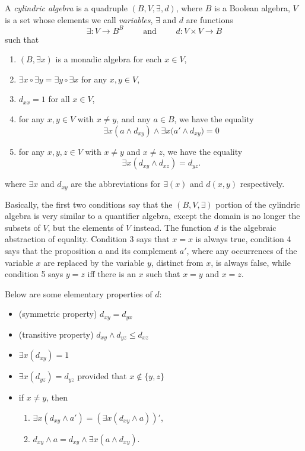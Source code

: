 \documentclass[12pt]{article}
\begin{document}
A \emph{cylindric algebra} is a quadruple $(B,V,\exists,d)$, where $B$ is a Boolean algebra, $V$ is a set whose elements we call \emph{variables}, $\exists$ and $d$ are functions
$$\exists:V\to B^B\qquad \mbox{ and } \qquad d:V\times V\to B$$
such that
\begin{enumerate}
\item $(B,\exists x)$ is a monadic algebra for each $x\in V$,
\item $\exists x\circ \exists y = \exists y\circ \exists x$ for any $x,y\in V$,
\item $d_{xx}=1$ for all $x\in V$,
\item for any $x,y\in V$ with $x\ne y$, and any $a \in B$, we have the equality $$\exists x(a\wedge d_{xy})\wedge \exists x\big(a'\wedge d_{xy}\big)=0$$
\item for any $x,y,z\in V$ with $x\ne y$ and $x\ne z$, we have the equality $$\exists x (d_{xy}\wedge d_{xz})=d_{yz}.$$
\end{enumerate}
where $\exists x$ and $d_{xy}$ are the abbreviations for $\exists(x)$ and $d(x,y)$ respectively.

Basically, the first two conditions say that the $(B,V,\exists)$ portion of the cylindric algebra is very similar to a quantifier algebra, except the domain is no longer the subsets of $V$, but the elements of $V$ instead.  The function $d$ is the algebraic abstraction of equality.  Condition 3 says that $x=x$ is always true, condition 4 says that the proposition $a$ and its complement $a'$, where any occurrences of the variable $x$ are replaced by the variable $y$, distinct from $x$, is always false, while condition 5 says $y=z$ iff there is an $x$ such that $x=y$ and $x=z$.

Below are some elementary properties of $d$:
\begin{itemize}
\item (symmetric property) $d_{xy}=d_{yx}$
\item (transitive property) $d_{xy}\wedge d_{yz}\le d_{xz}$
\item $\exists x(d_{xy})=1$
\item $\exists x(d_{yz})=d_{yz}$ provided that $x\notin \lbrace y,z\rbrace$
\item if $x\ne y$, then
\begin{enumerate}
\item $\exists x(d_{xy}\wedge a')= (\exists x(d_{xy}\wedge a))'$,
\item $d_{xy} \wedge a =d_{xy} \wedge \exists x(a\wedge d_{xy})$.
\end{enumerate}
\end{itemize}
\end{document}
